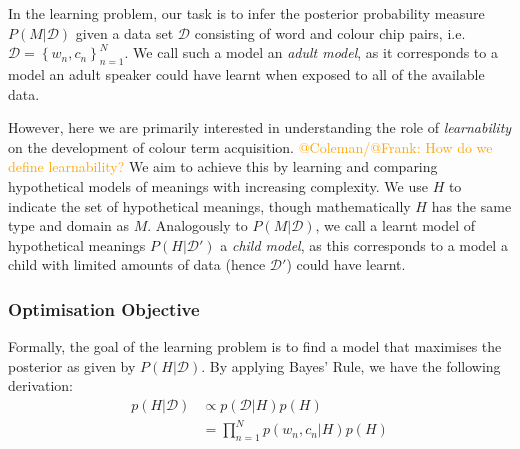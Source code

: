 \documentclass[11pt]{article}
\begin{document}
In the learning problem, our task is to infer the posterior probability measure $P(M|\mathcal{D})$ given a data set $\mathcal{D}$ consisting of word and colour chip pairs, i.e. $\mathcal{D}=\left\{w_n, c_n\right\}_{n=1}^{N}$. We call such a model an \textit{adult model}, as it corresponds to a model an adult speaker could have learnt when exposed to all of the available data. %

However, here we are primarily interested in understanding the role of \textit{learnability} on the development of colour term acquisition. \textcolor{orange}{@Coleman/@Frank: How do we define learnability?} We aim to achieve this by learning and comparing hypothetical models of meanings with increasing complexity. We use $H$ to indicate the set of hypothetical meanings, though mathematically $H$ has the same type and domain as $M$. Analogously to $P(M|\mathcal{D})$, we call a learnt model of hypothetical meanings $P(H|\mathcal{D}')$ a \textit{child model}, as this corresponds to a model a child with limited amounts of data (hence $\mathcal{D}'$) could have learnt.





\subsubsection{Optimisation Objective}
\label{sssec:learn_optim}

Formally, the goal of the learning problem is to find a model that maximises the posterior as given by $P(H|\mathcal{D})$. By applying Bayes' Rule, we have the following derivation:
\begin{equation}
    \label{eq:learning_objective_pH_D}
    \begin{split}
        p(H|\mathcal{D})
        & \propto p(\mathcal{D}|H)p(H) \\
        & = \prod_{n=1}^{N} p(w_n, c_n|H)p(H)
    \end{split}
\end{equation}
\end{document}
